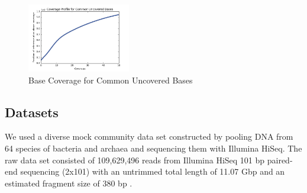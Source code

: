 \documentclass[10pt,a4paper,twocolumn]{article}
\begin{document}
\begin{figure}[!h]
\centering
\includegraphics[width=0.4\textwidth]{CommonUncoveredCoverageProfile.png} 
\caption{Base Coverage for Common Uncovered Bases}
\label{fig:CommonUncovered}
\end{figure}







 

\subsection*{Datasets}

We used a diverse mock community data set constructed by pooling DNA
from 64 species of bacteria and archaea and sequencing them with
Illumina HiSeq.  The raw data set consisted of 109,629,496 reads from
Illumina HiSeq 101 bp paired-end sequencing (2x101) with an untrimmed
total length of 11.07 Gbp and an estimated fragment size of 380 bp
\cite{podar}.
 
\end{document}
